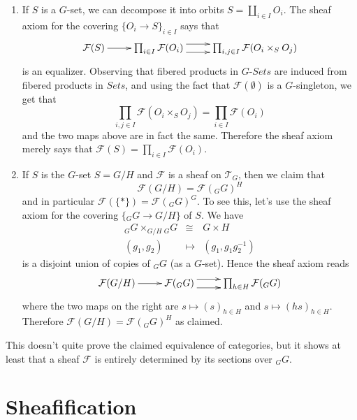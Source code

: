 \begin{enumerate}
\item 
If $S$ is a $G$-set, we can decompose it into orbits $S = \coprod_{i\in I} 
O_i$. The sheaf axiom for the covering $\{O_i \to S\}_{i\in I}$ says that 
$$
\xymatrix{
\mathcal{F}(S) \ar[r] &
\prod_{i\in I} \mathcal{F}(O_i) \ar@<1ex>[r] \ar@<-1ex>[r] &
\prod_{i,j \in I} \mathcal{F}(O_i \times_S O_j)
}
$$
is an equalizer. Observing that fibered products in $G\textit{-Sets}$ are 
induced from fibered products in $\textit{Sets}$, and using the fact that 
$\mathcal{F}(\emptyset)$ is a $G$-singleton, we get that 
$$
\prod_{i,j \in I} \mathcal{F}(O_i \times_S O_j) = \prod_{i \in I} 
\mathcal{F}(O_i)
$$
and the two maps above are in fact the same. Therefore the sheaf axiom merely 
says that $\mathcal{F}(S) = \prod_{i\in I} \mathcal{F}(O_i)$.
\item
If $S$ is the $G$-set $S= G/H$ and $\mathcal{F}$ is a sheaf on $\mathcal{T}_G$, 
then we claim that
$$
\mathcal{F}(G/H) = \mathcal{F}({}_G G)^H
$$
and in particular $\mathcal{F}(\{*\}) = \mathcal{F}({}_G G)^G$. To see this, 
let's use the sheaf axiom for the covering $\{ {}_G G \to G/H \}$ of $S$. We 
have 
\begin{eqnarray*}
{}_G G  \times_{G/H} {}_G G & \cong & G \times H \\
(g_1, g_2) & \longmapsto & (g_1, g_1 g_2^{-1})
\end{eqnarray*}
is a disjoint union of copies of ${}_G G$ (as a $G$-set). Hence the sheaf axiom 
reads
$$
\xymatrix{
\mathcal{F} (G/H) \ar[r] &
\mathcal{F}({}_G G) \ar@<1ex>[r] \ar@<-1ex>[r] &
\prod_{h\in H} \mathcal{F}({}_G G)
}
$$
where the two maps on the right are $s \mapsto  (s)_{h \in H}$ and $s \mapsto  
(hs)_{h \in H}$. Therefore $\mathcal{F}(G/H) = \mathcal{F}({}_G G)^H$ as 
claimed.
\end{enumerate}
This doesn't quite prove the claimed equivalence of categories, but it shows at 
least that a sheaf $\mathcal{F}$ is entirely determined by its sections over 
${}_G G$.

\section{Sheafification}
\label{section-sheafification}

